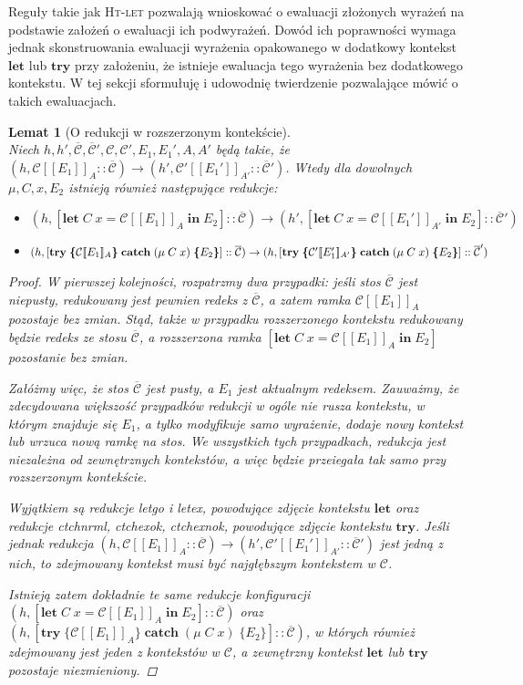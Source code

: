 \documentclass[]{pracamgr}
\renewcommand \| {\hspace{0.75em} | \hspace{0.75em} }
\renewcommand \[ {[\![}
\renewcommand \] {]\!]}
\newtheorem{lemma}{Lemat}
\theoremstyle{definition}
\newcommand{\mmod}{\mu\xspace}
\newcommand{\jlet}{\mathbf{let}\xspace}
\newcommand{\jin}{\mathbf{in}\xspace}
\newcommand{\jtry}{\mathbf{try}\xspace}
\newcommand{\jcatch}{\mathbf{catch}\xspace}
\newcommand{\letin}[4]{\jlet\; #1\; #2 = #3\; \jin\; #4\xspace}
\newcommand{\tcatch}[4]{\jtry\; \boldsymbol{\{}#1\boldsymbol{\}}\; \jcatch\; (#2\; #3)\; \boldsymbol{\{}#4\boldsymbol{\}}\xspace}
\newcommand{\ctxt}{\mathcal{C}\xspace}
\newcommand{\ctxts}{\overline{\ctxt}}
\begin{document}
Reguły takie jak \textsc{Ht-let} pozwalają wnioskować o ewaluacji złożonych wyrażeń
na podstawie założeń o ewaluacji ich podwyrażeń.
Dowód ich poprawności wymaga jednak skonstruowania ewaluacji wyrażenia opakowanego
w dodatkowy kontekst $\jlet$ lub $\jtry$ przy założeniu, że istnieje ewaluacja tego
wyrażenia bez dodatkowego kontekstu.
W tej sekcji sformułuję i udowodnię twierdzenie pozwalające mówić o takich ewaluacjach.

\begin{lemma}[O redukcji w rozszerzonym kontekście]{\ } \\
\label{lem:red_ext_ctx}
Niech $h, h', \ctxts, \ctxts', \ctxt, \ctxt', E_1, E_1', A, A'$ będą takie, że
$(h, \ctxt \[ E_1 \]_A :: \ctxts) \rightarrow (h', \ctxt' \[ E_1' \]_{A'} :: \ctxts')$.
Wtedy dla dowolnych $\mmod, C, x, E_2$ istnieją również następujące redukcje:
\begin{itemize}
 \item $(h, [ \letin{C}{x}{\ctxt \[ E_1 \]_A}{E_2}] :: \ctxts) \rightarrow
        (h', [ \letin{C}{x}{\ctxt \[ E_1'\]_{A'}}{E_2}] :: \ctxts')$
 \item $(h, [ \tcatch{\ctxt \[ E_1 \]_A}{\mmod\; C}{x}{E_2}] :: \ctxts) \rightarrow \\
        (h, [ \tcatch{\ctxt' \[ E_1' \]_{A'}}{\mmod\; C}{x}{E_2}] :: \ctxts')$
\end{itemize}
\begin{proof}
W pierwszej kolejności, rozpatrzmy dwa przypadki: jeśli stos $\ctxts$ jest niepusty,
redukowany jest pewnien redeks z $\ctxts$, a zatem ramka $\ctxt\[E_1\]_A$ pozostaje bez zmian.
Stąd, także w przypadku rozszerzonego kontekstu redukowany będzie redeks ze stosu $\ctxts$, a
rozszerzona ramka $[ \letin{C}{x}{\ctxt \[ E_1 \]_A}{E_2}]$ pozostanie bez zmian.

Załóżmy więc, że stos $\ctxts$ jest pusty, a $E_1$ jest aktualnym redeksem.
Zauważmy, że zdecydowana większość przypadków redukcji w ogóle nie rusza kontekstu,
w którym znajduje się $E_1$, a tylko modyfikuje samo wyrażenie, dodaje nowy kontekst
lub wrzuca nową ramkę na stos. We wszystkich tych przypadkach, redukcja jest niezależna od
zewnętrznych kontekstów, a więc będzie przeiegała tak samo przy rozszerzonym kontekście.

Wyjątkiem są redukcje letgo i letex, powodujące zdjęcie kontekstu $\jlet$ oraz
redukcje ctchnrml, ctchexok, ctchexnok, powodujące zdjęcie kontekstu $\jtry$.
Jeśli jednak redukcja
$(h, \ctxt \[ E_1 \]_A :: \ctxts) \rightarrow (h', \ctxt' \[ E_1' \]_{A'} :: \ctxts')$
jest jedną z nich, to zdejmowany kontekst musi być najgłębszym kontekstem w $\ctxt$.

Istnieją zatem dokładnie te same redukcje konfiguracji
$(h, [ \letin{C}{x}{\ctxt \[ E_1 \]_A}{E_2}] :: \ctxts)$ oraz
$(h, [ \tcatch{\ctxt \[ E_1 \]_A}{\mmod\; C}{x}{E_2}] :: \ctxts)$,
w których również zdejmowany jest
jeden z kontekstów w $\ctxt$, a zewnętrzny kontekst $\jlet$ lub $\jtry$ pozostaje niezmieniony.
\end{proof}
\end{lemma}
\end{document}
